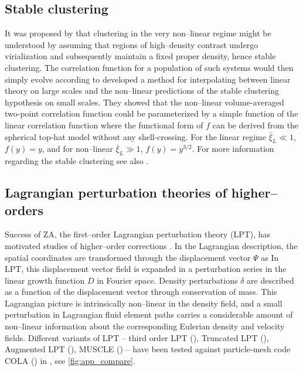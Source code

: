 \subsection{Stable clustering}
It was proposed by \textcite{1974ApJ...189L..51P} that clustering in the very non--linear regime might be understood by assuming that regions of high--density contrast undergo virialization and subsequently maintain a fixed proper density, hence stable clustering. The correlation function for a population of such systems would then simply evolve according to
\textcite{1991ApJ...374L...1H} developed a method for interpolating between linear theory on large scales and the non--linear predictions of the stable clustering hypothesis on small scales. They showed that the non--linear volume-averaged two-point correlation function could be parameterized by a simple function of the linear correlation function
where the functional form of $f$ can be derived from the spherical top-hat model without any shell-crossing. For the linear regime $\bar\xi_{L}\ll1$, $f(y)=y$, and for non--linear $\bar\xi_{L}\gg1$, $f(y)=y^{3/2}$. For more information regarding the stable clustering see  also \textcite{1996MNRAS.280L..19P,2003MNRAS.341.1311S}.
\subsection{Lagrangian perturbation theories of higher--orders}
Success of ZA, the first--order Lagrangian perturbation theory (LPT), has motivated studies of higher--order corrections \parencite[see e.g.][]{10.1093/mnras/264.2.375,2002PhR...367....1B,2010MNRAS.403.1859J,2014ApJ...788...63S}. In the Lagrangian description, the spatial coordinates are transformed through the displacement vector $\Psi$ as
In LPT, this displacement vector field is expanded in a perturbation series in the linear growth function $D$ in Fourier space. Density perturbations $\delta$ are described as a function of the displacement vector through conservation of mass. This Lagrangian picture is intrinsically non--linear in the density field, and a small perturbation in Lagrangian fluid element paths carries a considerable amount of non--linear information about the corresponding Eulerian density and velocity fields. Different variants of LPT -- third order LPT (\cite{10.1093/mnras/264.2.375}), Truncated LPT (\cite{10.1093/mnras/260.4.765}), Augmented LPT (\cite{10.1093/mnrasl/slt101}), MUSCLE (\cite{10.1093/mnrasl/slv141}) -- have been tested against particle-mesh code COLA (\cite{2013JCAP...06..036T}) in \cite{2017JCAP...07..050M}, see \autoref{fig:app_compare}.

